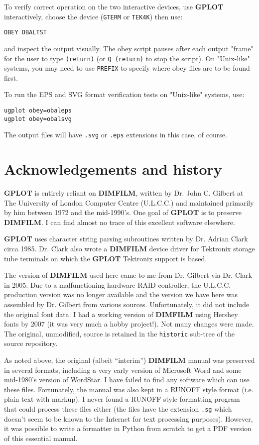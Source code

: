 \documentclass[a4paper,twoside,11pt]{article}
\newcommand{\newpara}{\par\vspace{4mm}\noindent}
\begin{document}
\newpara
To verify correct operation on the two interactive devices,
use \textbf{GPLOT} interactively, choose the device
(\texttt{GTERM} or \texttt{TEK4K}) then use:
\begin{lstlisting}
OBEY OBALTST
\end{lstlisting}
and inspect the output visually. The obey script pauses
after each output "frame" for the user to type \texttt{(return)}
(or \texttt{Q (return)} to stop the script). On "Unix-like"
systems, you may need to use \texttt{PREFIX} to specify where obey
files are to be found first.

\newpara
To run the EPS and SVG format verification tests on
"Unix-like" systems, use:
\begin{lstlisting}
ugplot obey=obaleps
ugplot obey=obalsvg
\end{lstlisting}

\newpara
The output files will have \texttt{.svg} or \texttt{.eps} extensions in 
this case, of course.



\section{Acknowledgements and history}
\newpara
\textbf{GPLOT} is entirely reliant on \textbf{DIMFILM}, written by Dr. John C. Gilbert at The University of London
Computer Centre (U.L.C.C.) and maintained primarily by him between 1972 and the mid-1990's. One goal of \textbf{GPLOT} is to
preserve \textbf{DIMFILM}. I can find almost no trace of this excellent software elsewhere.

\newpara
\textbf{GPLOT} uses character
string parsing subroutines written by Dr. Adrian Clark circa 1985. Dr. Clark also wrote a \textbf{DIMFILM} device
driver for Tektronix storage tube terminals on which the \textbf{GPLOT} Tektronix support
is based.

\newpara
The version of \textbf{DIMFILM} used here came to me from Dr. Gilbert via Dr. Clark in 2005. Due to a malfunctioning hardware
RAID controller, the U.L.C.C. production version was no longer available and the version we have here
was assembled by Dr. Gilbert from various sources. Unfortunately, it did not include the original font data. I had a
working version of \textbf{DIMFILM} using Hershey fonts by 2007 (it was very much a hobby project!). Not many changes were made.
The original, unmodified, source is retained in the \texttt{historic} sub-tree of the source repository.

\newpara
As noted above,
the original (albeit ``interim'') \textbf{DIMFILM} manual was preserved in several formats, including a very early version
of Microsoft Word and some mid-1980's version of WordStar. I have failed to find any software which can use these
files. Fortunately, the manual was also kept in a RUNOFF style format (i.e. plain text with markup). I never found
a RUNOFF style formatting program that could process these files either (the files have the extension \texttt{.sg} which
doesn't seem to be known to the Internet for text processing purposes). However, it was possible to write a
formatter in Python from scratch to get a PDF version of this essential manual.
\end{document}

